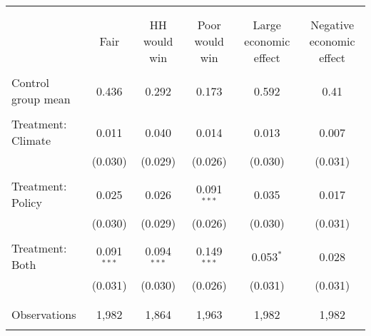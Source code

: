 
\begin{tabular}{@{\extracolsep{5pt}}lccccc} 
\\[-1.8ex]\hline 
\hline \\[-1.8ex] 
\\[-1.8ex] & Fair & HH would win & Poor would win & Large economic effect & Negative economic effect \\ 
\hline \\[-1.8ex] 
 Control group mean & 0.436 & 0.292 & 0.173 & 0.592 & 0.41  \\ \hline \\[-1.8ex] Treatment: Climate & 0.011 & 0.040 & 0.014 & 0.013 & 0.007 \\ 
  & (0.030) & (0.029) & (0.026) & (0.030) & (0.031) \\ 
  & & & & & \\ 
 Treatment: Policy & 0.025 & 0.026 & 0.091$^{***}$ & 0.035 & 0.017 \\ 
  & (0.030) & (0.029) & (0.026) & (0.030) & (0.031) \\ 
  & & & & & \\ 
 Treatment: Both & 0.091$^{***}$ & 0.094$^{***}$ & 0.149$^{***}$ & 0.053$^{*}$ & 0.028 \\ 
  & (0.031) & (0.030) & (0.026) & (0.031) & (0.031) \\ 
  & & & & & \\ 
\hline \\[-1.8ex] 

Observations & 1,982 & 1,864 & 1,963 & 1,982 & 1,982 \\ 
\hline 
\hline \\[-1.8ex] 
\end{tabular} 